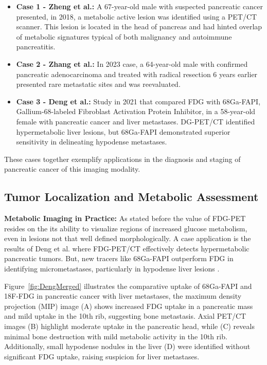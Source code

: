 \documentclass[11pt]{article} %
\begin{document}
\begin{itemize}
    \item \textbf{Case 1 - Zheng et al.:} 
    A 67-year-old male  with suspected pancreatic cancer presented, in 2018, a metabolic active lesion was identified using a PET/CT scanner. This lesion is located in the head of pancreas and had hinted overlap of metabolic signatures typical of both malignancy and autoimmune pancreatitis\cite{Zheng2018}.
    \item \textbf{Case 2 - Zhang et al.:} 
    In 2023 case, a 64-year-old male with confirmed pancreatic adenocarcinoma and treated with radical resection 6 years earlier presented rare metastatic sites and was reevaluated\cite{Zhang2023}.
    \item \textbf{Case 3 - Deng et al.:} 
    Study in 2021 that compared FDG with 68Ga-FAPI, Gallium-68-labeled Fibroblast Activation Protein Inhibitor, in a 58-year-old female with pancreatic cancer and liver metastases. DG-PET/CT identified hypermetabolic liver lesions, but 68Ga-FAPI demonstrated superior sensitivity in delineating hypodense metastases\cite{Deng2021}.
\end{itemize}

These cases together exemplify applications in the diagnosis and staging of pancreatic cancer of this imaging modality.

\subsection{Tumor Localization and Metabolic Assessment}

\textbf{Metabolic Imaging in Practice:} As stated before the value of FDG-PET resides on the its ability to visualize regions of increased glucose metabolism, even in lesions not that well defined morphologically. A case application is the results of Deng et al. where FDG-PET/CT effectively detects hypermetabolic pancreatic tumors. But, new tracers like 68Ga-FAPI outperform FDG in identifying micrometastases, particularly in hypodense liver lesions \cite{Deng2021}. %

Figure~\ref{fig:DengMerged} illustrates the comparative uptake of 68Ga-FAPI and 18F-FDG in pancreatic cancer with liver metastases, the maximum density projection (MIP) image (A) shows increased FDG uptake in a pancreatic mass and mild uptake in the 10th rib, suggesting bone metastasis. Axial PET/CT images (B) highlight moderate uptake in the pancreatic head, while (C) reveals minimal bone destruction with mild metabolic activity in the 10th rib. Additionally, small hypodense nodules in the liver (D) were identified without significant FDG uptake, raising suspicion for liver metastases.
\end{document}
